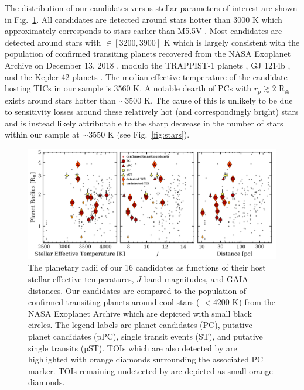 The distribution of our candidates versus stellar parameters of interest are shown in
Fig.~\ref{fig:planetstar}. All candidates are detected around stars hotter than 3000 K which
approximately corresponds to stars earlier than M5.5V \citep{pecaut13}. Most candidates
are detected around stars with \teff{} $\in [3200,3900]$ K which is largely consistent with the
population of confirmed transiting planets recovered from the NASA Exoplanet Archive on
December 13, 2018 \citep{akeson13}, modulo the TRAPPIST-1 planets \citep{gillon17}, GJ 1214b
\citep{charbonneau09}, and the Kepler-42 planets \citep{muirhead12b}. The median effective
temperature of the candidate-hosting TICs in our sample is 3560 K. A notable dearth of PCs
with $r_p \gtrsim 2$ R$_{\oplus}$ exists around stars hotter than $\sim 3500$ K. The cause of
this is unlikely to be due to sensitivity losses around these relatively hot (and correspondingly
bright) stars and is instead likely attributable to the sharp decrease in the number of stars
within our sample at \teff{} $\sim 3550$ K (see Fig.~\ref{fig:stars}).

\begin{figure}
  \centering
  \includegraphics[width=0.9\hsize]{figures/planetsample_star.png}
  \caption[Stellar parameters for the \texttt{ORION} planet candidate sample host stars.]
      {The planetary radii of our 16 \pipeline{} candidates as functions of their host stellar
    effective temperatures, $J$-band magnitudes, and GAIA distances. Our candidates
    are compared to the population of confirmed transiting planets around cool stars (\teff{} $<4200$
    K) from the NASA Exoplanet Archive which are depicted with small black circles.
    The legend labels are planet candidates (PC), 
    putative planet candidates (pPC), 
    single transit events (ST), and  putative single transits (pST).
    TOIs which are also detected by \pipeline{} are highlighted with
    orange diamonds surrounding the associated PC marker. TOIs remaining undetected by \pipeline{}
    are depicted as small orange diamonds.}
  \label{fig:planetstar}
\end{figure}

